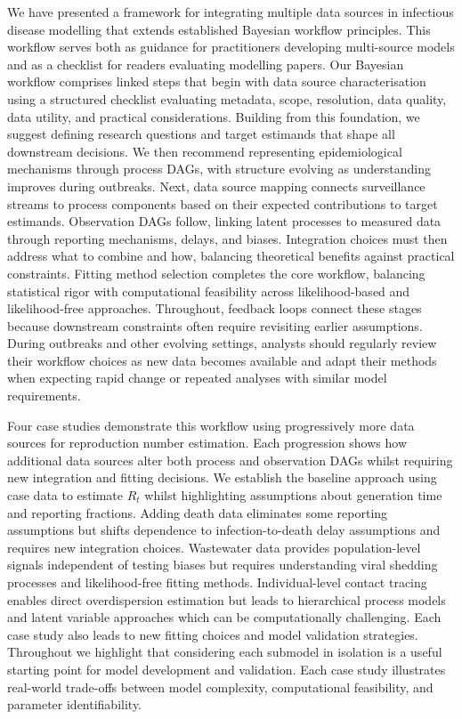 \documentclass{article}
\begin{document}
We have presented a framework for integrating multiple data sources in infectious disease modelling that extends established Bayesian workflow principles.
This workflow serves both as guidance for practitioners developing multi-source models and as a checklist for readers evaluating modelling papers.
Our Bayesian workflow comprises linked steps that begin with data source characterisation using a structured checklist evaluating metadata, scope, resolution, data quality, data utility, and practical considerations.
Building from this foundation, we suggest defining research questions and target estimands that shape all downstream decisions.
We then recommend representing epidemiological mechanisms through process DAGs, with structure evolving as understanding improves during outbreaks.
Next, data source mapping connects surveillance streams to process components based on their expected contributions to target estimands.
Observation DAGs follow, linking latent processes to measured data through reporting mechanisms, delays, and biases.
Integration choices must then address what to combine and how, balancing theoretical benefits against practical constraints.
Fitting method selection completes the core workflow, balancing statistical rigor with computational feasibility across likelihood-based and likelihood-free approaches.
Throughout, feedback loops connect these stages because downstream constraints often require revisiting earlier assumptions.
During outbreaks and other evolving settings, analysts should regularly review their workflow choices as new data becomes available and adapt their methods when expecting rapid change or repeated analyses with similar model requirements.

Four case studies demonstrate this workflow using progressively more data sources for reproduction number estimation.
Each progression shows how additional data sources alter both process and observation DAGs whilst requiring new integration and fitting decisions.
We establish the baseline approach using case data to estimate $R_t$ whilst highlighting assumptions about generation time and reporting fractions.
Adding death data eliminates some reporting assumptions but shifts dependence to infection-to-death delay assumptions and requires new integration choices.
Wastewater data provides population-level signals independent of testing biases but requires understanding viral shedding processes and likelihood-free fitting methods.
Individual-level contact tracing enables direct overdispersion estimation but leads to hierarchical process models and latent variable approaches which can be computationally challenging.
Each case study also leads to new fitting choices and model validation strategies.
Throughout we highlight that considering each submodel in isolation is a useful starting point for model development and validation.
Each case study illustrates real-world trade-offs between model complexity, computational feasibility, and parameter identifiability.
\end{document}
